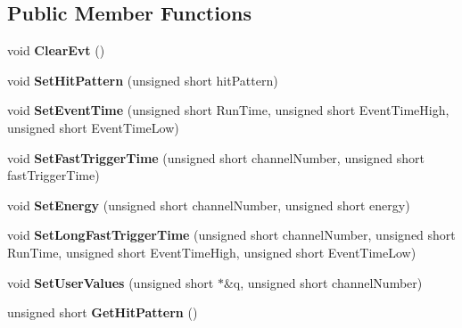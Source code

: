 \subsection*{Public Member Functions}
\begin{DoxyCompactItemize}
\item 
\mbox{\label{class_dgf_sub_event_a46977843cc3254ae9c129cf044b9a140}} 
void {\bfseries Clear\+Evt} ()
\item 
\mbox{\label{class_dgf_sub_event_a57465895ade7d2bd229d7c4b6eac28fe}} 
void {\bfseries Set\+Hit\+Pattern} (unsigned short hit\+Pattern)
\item 
\mbox{\label{class_dgf_sub_event_ae7733bc6e848b1f87add491e3e4139f2}} 
void {\bfseries Set\+Event\+Time} (unsigned short Run\+Time, unsigned short Event\+Time\+High, unsigned short Event\+Time\+Low)
\item 
\mbox{\label{class_dgf_sub_event_afbfad40671d380b51f11e920ba2bb109}} 
void {\bfseries Set\+Fast\+Trigger\+Time} (unsigned short channel\+Number, unsigned short fast\+Trigger\+Time)
\item 
\mbox{\label{class_dgf_sub_event_a2f301efaff91959dae2a3b4d015b8cd5}} 
void {\bfseries Set\+Energy} (unsigned short channel\+Number, unsigned short energy)
\item 
\mbox{\label{class_dgf_sub_event_a09387034596827f924bce4a4aa84a8be}} 
void {\bfseries Set\+Long\+Fast\+Trigger\+Time} (unsigned short channel\+Number, unsigned short Run\+Time, unsigned short Event\+Time\+High, unsigned short Event\+Time\+Low)
\item 
\mbox{\label{class_dgf_sub_event_a5dd58fb29bb11c8870ef8f275024a995}} 
void {\bfseries Set\+User\+Values} (unsigned short $\ast$\&q, unsigned short channel\+Number)
\item 
\mbox{\label{class_dgf_sub_event_a19d751e8ab22da36113ba864b28b425e}} 
unsigned short {\bfseries Get\+Hit\+Pattern} ()
\item 
\mbox{\label{class_dgf_sub_event_adc8e12fe656b4d63ab2b6800a04eeb7c}} 

\end{DoxyCompactItemize}
